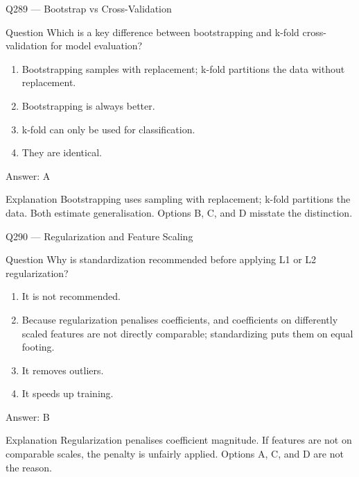 \documentclass[aspectratio=169,8pt]{beamer}
\begin{document}
\begin{frame}{Q289 --- Bootstrap vs Cross-Validation}
\begin{block}{Question}
Which is a key difference between bootstrapping and k-fold cross-validation for model evaluation?
\begin{enumerate}
\item Bootstrapping samples with replacement; k-fold partitions the data without replacement.
\item Bootstrapping is always better.
\item k-fold can only be used for classification.
\item They are identical.
\end{enumerate} \end{block}
\begin{exampleblock}{Answer: A}\end{exampleblock}
\begin{block}{Explanation}
Bootstrapping uses sampling with replacement; k-fold partitions the data. Both estimate generalisation. Options B, C, and D misstate the distinction.
\end{block}
\end{frame}

\begin{frame}{Q290 --- Regularization and Feature Scaling}
\begin{block}{Question}
Why is standardization recommended before applying L1 or L2 regularization?
\begin{enumerate}
\item It is not recommended.
\item Because regularization penalises coefficients, and coefficients on differently scaled features are not directly comparable; standardizing puts them on equal footing.
\item It removes outliers.
\item It speeds up training.
\end{enumerate} \end{block}
\begin{exampleblock}{Answer: B}\end{exampleblock}
\begin{block}{Explanation}
Regularization penalises coefficient magnitude. If features are not on comparable scales, the penalty is unfairly applied. Options A, C, and D are not the reason.
\end{block}
\end{frame}
\end{document}
